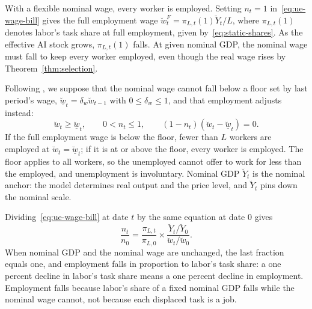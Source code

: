 \documentclass[11pt]{article}
\begin{document}
With a flexible nominal wage, every worker is employed. Setting $n_{t}=1$
in~\eqref{eq:ue-wage-bill} gives the full employment wage $\breve{w}^{F}_{t}=\pi_{L,t}(1)\breve{Y}_{t}/L$,
where $\pi_{L,t}(1)$ denotes labor's task share at full employment,
given by~\eqref{eq:static-shares}. As the effective AI stock grows,
$\pi_{L,t}(1)$ falls. At given nominal GDP, the nominal wage must
fall to keep every worker employed, even though the real wage rises
by Theorem~\ref{thm:selection}.

Following \citet{ruv2025}, we suppose that the nominal wage cannot
fall below a floor set by last period's wage, $\underline{\breve{w}}_{t}=\delta_{w}\breve{w}_{t-1}$
with $0\leq\delta_{w}\leq1$, and that employment adjusts instead:
\begin{equation}
\breve{w}_{t}\geq\underline{\breve{w}}_{t},\qquad0<n_{t}\leq1,\qquad(1-n_{t})(\breve{w}_{t}-\underline{\breve{w}}_{t})=0.\label{eq:ue-floor}
\end{equation}
If the full employment wage is below the floor, fewer than $L$ workers
are employed at $\breve{w}_{t}=\underline{\breve{w}}_{t}$; if it
is at or above the floor, every worker is employed. The floor applies
to all workers, so the unemployed cannot offer to work for less than
the employed, and unemployment is involuntary. Nominal GDP $\breve{Y}_{t}$
is the nominal anchor: the model determines real output and the price
level, and $\breve{Y}_{t}$ pins down the nominal scale.

Dividing~\eqref{eq:ue-wage-bill} at date $t$ by the same equation
at date $0$ gives
\begin{equation}
\frac{n_{t}}{n_{0}}=\frac{\pi_{L,t}}{\pi_{L,0}}\times\frac{\breve{Y}_{t}/\breve{Y}_{0}}{\breve{w}_{t}/\breve{w}_{0}}.\label{eq:ue-employment}
\end{equation}
When nominal GDP and the nominal wage are unchanged, the last fraction
equals one, and employment falls in proportion to labor's task share:
a one percent decline in labor's task share means a one percent decline
in employment. Employment falls because labor's share of a fixed nominal
GDP falls while the nominal wage cannot, not because each displaced
task is a job.
\end{document}
